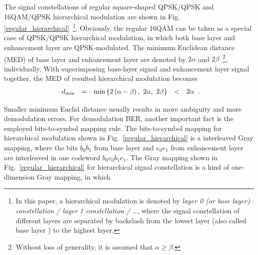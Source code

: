 \documentclass[10pt,fleqn, twocolumn]{IEEEtran}
\begin{document}
The signal constellations of regular square-shaped QPSK/QPSK and
16QAM/QPSK hierarchical modulation are shown in Fig.
\ref{regular_hierarchical}~\footnote{In this paper, a hierarchical
modulation is denoted by {\em layer 0 (or base layer)
constellation / layer 1 constellation / \ldots}, where the signal
constellation of different layers are separated by backslash from
the lowest layer (also called base layer ) to the highest layer.
}. Obviously, the regular 16QAM can be taken as a special case of
QPSK/QPSK hierarchical modulation, in which both base layer and
enhancement layer are QPSK-modulated. The minimum Euclidean
distance (MED) of base layer and enhancement layer are denoted by
$2\alpha$ and $2\beta$~\footnote{Without loss of generality, it is
assumed that $\alpha\geq\beta$.}, individually. With superimposing
base-layer signal and enhancement layer signal together, the MED
of resulted hierarchical modulation becomes
\begin{equation}
\begin{array}{rcccl}
d_{\rm min}& = & \min\left\{2\left(\alpha-\beta\right),\ 2\alpha,\
2\beta\right\}&<& 2\alpha
\end{array}.\label{Regular_MED}
\end{equation}
\begin{figure}
\end{figure}
\noindent Smaller minimum Euclid distance usually results in more
ambiguity and more demodulation errors. For demodulation BER,
another important fact is the employed bits-to-symbol mapping
rule. The bits-to-symbol mapping for hierarchical modulation shown
in Fig.~\ref{regular_hierarchical} is a interleaved Gray mapping,
where the bits $b_{0}b_{1}$ from base layer and $e_{0}e_{1}$ from
enhancement layer are interleaved in one codeword
$b_{0}e_{0}b_{1}e_{1}$. The Gray mapping shown in
Fig.~\ref{regular_hierarchical} for hierarchical signal
constellation is a kind of one-dimension Gray mapping, in which
\end{document}
